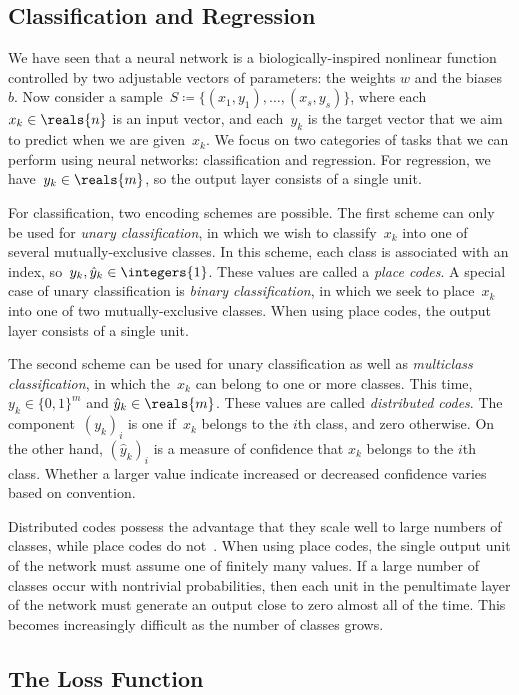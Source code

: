 \documentclass[11pt,a4paper]{article}
\numberwithin{equation}{section}
\begin{document}
\subsection{Classification and Regression}

We have seen that a neural network is a biologically-inspired nonlinear function
controlled by two adjustable vectors of parameters: the weights $w$ and the
biases~$b$. Now consider a sample~$S \coloneqq \{(x_1, y_1), \ldots, (x_s,
y_s)\}$, where each~$x_k \in \reals{n}$ is an input vector, and each~$y_k$ is
the target vector that we aim to predict when we are given~$x_k$. We focus on
two categories of tasks that we can perform using neural networks:
classification and regression. For regression, we have~$y_k \in \reals{m}$, so
the output layer consists of a single unit.

For classification, two encoding schemes are possible. The first scheme can only
be used for \emph{unary classification}, in which we wish to classify~$x_k$ into
one of several mutually-exclusive classes. In this scheme, each class is
associated with an index, so~$y_k, \hat{y}_k \in \integers{1}$. These values are
called a \emph{place codes}. A special case of unary classification is
\emph{binary classification}, in which we seek to place~$x_k$ into one of two
mutually-exclusive classes. When using place codes, the output layer consists of
a single unit.

The second scheme can be used for unary classification as well as
\emph{multiclass classification}, in which the~$x_k$ can belong to one or more
classes. This time,~$y_k \in \{0, 1\}^m$ and $\hat{y}_k \in \reals{m}$. These
values are called \emph{distributed codes}. The component~$(y_k)_i$ is one
if~$x_k$ belongs to the $i$th class, and zero otherwise. On the other hand,
$(\hat{y}_k)_i$ is a measure of confidence that $x_k$ belongs to the $i$th
class. Whether a larger value indicate increased or decreased confidence varies
based on convention.

Distributed codes possess the advantage that they scale well to large
numbers of classes, while place codes do not~\citep{lecun-98b}. When using place
codes, the single output unit of the network must assume one of finitely many
values. If a large number of classes occur with nontrivial probabilities, then
each unit in the penultimate layer of the network must generate an output close
to zero almost all of the time. This becomes increasingly difficult as the
number of classes grows.

\subsection{The Loss Function}
\end{document}
